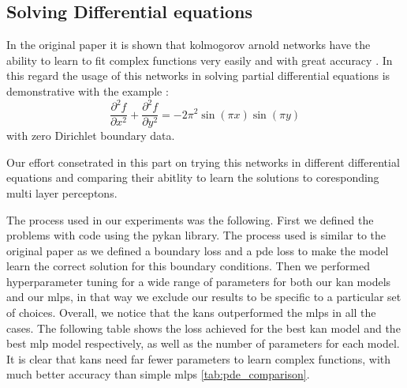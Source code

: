 \documentclass[conference]{IEEEtran}
\begin{document}
\subsection{Solving Differential equations}
In the original paper \cite{kans} it is shown that kolmogorov arnold networks
have the ability to learn to fit complex functions very easily and with great
accuracy . In this regard the usage of this networks in solving partial
differential equations is demonstrative with the example :
\[
    \frac{\partial^2 f}{\partial x^2} + \frac{\partial^2 f}{\partial y^2} = -2 \pi^2 \sin(\pi x) \sin(\pi y)
\]
with zero Dirichlet boundary data.

Our effort consetrated in this part on trying this networks in different
differential equations and comparing their abitlity to learn the solutions to
coresponding multi layer perceptons.

The process used in our experiments was the following. First we defined the
problems with code using the pykan library. The process used is similar to the
original paper as we defined a boundary loss and a pde loss to make the model
learn the correct solution for this boundary conditions. Then we performed
hyperparameter tuning for a wide range of parameters for both our kan models
and our mlps, in that way we exclude our results to be specific to a particular
set of choices. Overall, we notice that the kans outperformed the mlps in all
the cases. The following table shows the loss achieved for the best kan model
and the best mlp model respectively, as well as the number of parameters for
each model. It is clear that kans need far fewer parameters to learn complex
functions, with much better accuracy than simple mlps \ref{tab:pde_comparison}.
\end{document}
